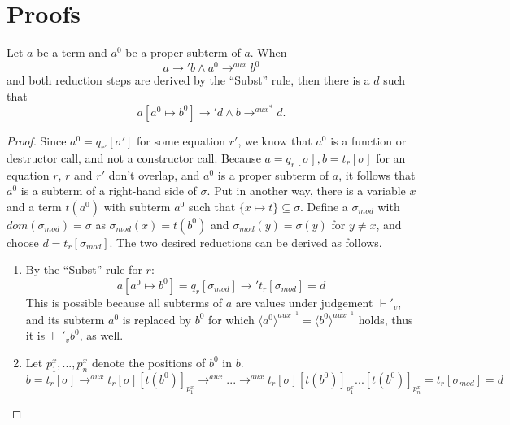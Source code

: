 \chapter{Proofs}

\begin{lemma}
Let $a$ be a term and $a^0$ be a proper subterm of $a$. When
\[
a \longrightarrow' b \land a^0 \longrightarrow^{aux} b^0
\]
and both reduction steps are derived by the ``Subst'' rule, then there is a $d$ such that
\[
a[a^0 \mapsto b^0] \longrightarrow' d \land b {\longrightarrow^{aux}}^* d.
\]

\begin{proof}
Since $a^0 = q_{r'}[\sigma']$ for some equation $r'$, we know that $a^0$ is a function or destructor call, and not a constructor call. Because $a = q_r[\sigma], b = t_r[\sigma]$ for an equation $r$, $r$ and $r'$ don't overlap, and $a^0$ is a proper subterm of $a$, it follows that $a^0$ is a subterm of a right-hand side of $\sigma$. Put in another way, there is a variable $x$ and a term $t(a^0)$ with subterm $a^0$ such that $\{x \mapsto t\} \subseteq \sigma$. Define a $\sigma_{mod}$ with $dom(\sigma_{mod}) = \sigma$ as $\sigma_{mod}(x) = t(b^0)$ and $\sigma_{mod}(y) = \sigma(y)$ for $y \neq x$, and choose $d = t_r[\sigma_{mod}]$. The two desired reductions can be derived as follows.
\begin{enumerate}
\item By the ``Subst'' rule for $r$:
\[
a[a^0 \mapsto b^0] = q_r[\sigma_{mod}] \longrightarrow' t_r[\sigma_{mod}] = d
\]
This is possible because all subterms of $a$ are values under judgement $\vdash'_v$, and its subterm $a^0$ is replaced by $b^0$ for which $\langle a^0 \rangle^{aux^{-1}} = \langle b^0 \rangle^{aux^{-1}}$ holds, thus it is $\vdash'_v b^0$, as well.

\item Let $p^x_1, ..., p^x_n$ denote the positions of $b^0$ in $b$.
\[
b = t_r[\sigma] \longrightarrow^{aux} t_r[\sigma][t(b^0)]_{p^x_1} \longrightarrow^{aux} ... \longrightarrow^{aux} t_r[\sigma][t(b^0)]_{p^x_1}...[t(b^0)]_{p^x_n} = t_r[\sigma_{mod}] = d
\]
\end{enumerate}
\end{proof}
\end{lemma}

